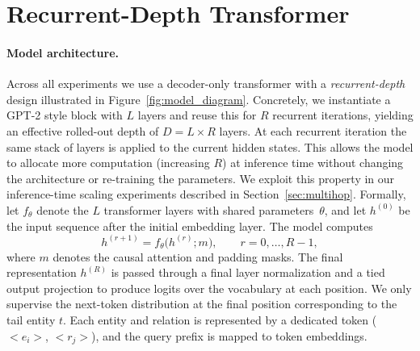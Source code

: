 \documentclass{article} %
\newcommand{\hs}[1]{\textcolor{red}{[Huan: #1]}}
\begin{document}
\section{Recurrent-Depth Transformer}
\label{sec:model-design}
\paragraph{Model architecture.}
Across all experiments we use a decoder-only transformer with a \emph{recurrent-depth} design illustrated in Figure~\ref{fig:model_diagram}. Concretely, we instantiate a GPT-2 style block with $L$ layers and reuse this for $R$ recurrent iterations, yielding an effective rolled-out depth of $D = L \times R$ layers. At each recurrent iteration the same stack of layers is applied to the current hidden states. This allows the model to allocate more computation (increasing $R$) at inference time without changing the architecture or re-training the parameters. We exploit this property in our inference-time scaling experiments described in Section~\ref{sec:multihop}. Formally, let $f_\theta$ denote the $L$ transformer layers with shared parameters~$\theta$, and let $h^{(0)}$ be the input sequence after the initial embedding layer. The model computes
\[
    h^{(r+1)} = f_\theta\big(h^{(r)}; m\big), \qquad r = 0, \dots, R-1,
\]
where $m$ denotes the causal attention and padding masks. The final representation $h^{(R)}$ is passed through a final layer normalization and a tied output projection to produce logits over the vocabulary at each position. We only supervise the next-token distribution at the final position corresponding to the tail entity $t$. Each entity and relation is represented by a dedicated token (\texttt{$<e_i>$}, \texttt{$<r_j>$}), and the query prefix is mapped to token embeddings. 
\end{document}
